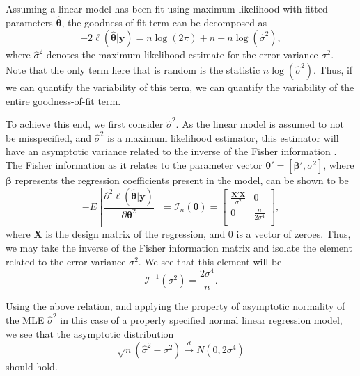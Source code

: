 \documentclass[review]{elsarticle}
\begin{document}
		Assuming a linear model has been fit using maximum likelihood with fitted parameters $\hat{\bm{\theta}}$, the goodness-of-fit term can be decomposed as
		\begin{equation}
			-2 \ell (\hat{\bm{\theta}} | \bm{y} ) = n \log(2 \pi) + n + n \log(\hat{\sigma}^2 ) ,
		\end{equation}
		where $\hat{\sigma}^2$ denotes the maximum likelihood estimate for the error variance $\sigma^2$. Note that the only term here that is random is
		the statistic $n \log(\hat{\sigma}^2)$. Thus, if we can quantify the variability of this term, we can quantify the variability of the entire goodness-of-fit
		term.

		To achieve this end, we first consider $\hat{\sigma}^2$. As the linear model is assumed to not be misspecified, and $\hat{\sigma}^2$ is a maximum likelihood
		estimator, this estimator will have an asymptotic variance related to the inverse of the Fisher information \citep{Fisher}. The Fisher information as it relates
		to the parameter vector $\bm{\theta}' = [\bm{\beta}', \sigma^2]$, where $\bm{\beta}$ represents the regression coefficients
		present in the model, can be shown to be
		\begin{equation*}
			- E \left[ \frac{\partial^2 \ell (\hat{\bm{\theta}} | \bm{y} )}{\partial \bm{\theta}^2} \right] = \bm{\mathcal{I}}_{n}(\bm{\theta}) =
			\begin{bmatrix}
				\frac{\bm{X}' \bm{X}}{\sigma^2} & 0 \\
				0 & \frac{n}{2 \sigma^4} \\
			\end{bmatrix}
			,
		\end{equation*}
		where $\bm{X}$ is the design matrix of the regression, and $0$ is a vector of zeroes. Thus, we may take the inverse of the Fisher information matrix and isolate
		the element related to the error variance $\sigma^2$. We see that this element will be
		\begin{equation*}
			\bm{\mathcal{I}}^{-1}(\sigma ^2) = \frac{2 \sigma ^4}{n} .
		\end{equation*}
		
		Using the above relation, and applying the property of asymptotic normality of the MLE $\hat{\sigma}^2$ in this case of a properly specified normal linear
		regression model, we see that the asymptotic distribution
		\begin{equation*}
			\sqrt{n} (\hat{\sigma}^2 - \sigma^2) \xrightarrow[]{d} N(0, 2 \sigma ^4 )
		\end{equation*}
		should hold.
\end{document}
